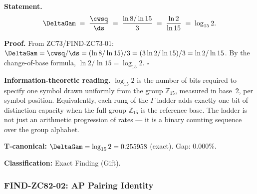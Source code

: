 \documentclass[12pt, a4paper]{article}
\begin{document}
\begin{giftbox}[title={FIND-ZC82-01: $\DeltaGam = \log_{15}2$
  --- The Ladder Step Is One Base-15 Bit ($R_0$, Exact, Gift)}]

\textbf{Statement.}
\begin{equation}
  \DeltaGam \;=\; \frac{\cwsq}{\ds}
  \;=\; \frac{\ln 8/\ln 15}{3}
  \;=\; \frac{\ln 2}{\ln 15}
  \;=\; \log_{15} 2.
  \label{eq:ladder-bit}
\end{equation}

\textbf{Proof.}
From ZC73/FIND-ZC73-01: $\DeltaGam = \cwsq/\ds
= (\ln 8/\ln 15)/3 = (3\ln2/\ln15)/3 = \ln2/\ln15$.
By the change-of-base formula, $\ln2/\ln15 = \log_{15}2$.
\hfill$\square$

\textbf{Information-theoretic reading.}
$\log_{15}2$ is the number of bits required to specify one
symbol drawn uniformly from the group $\mathbb{Z}_{15}$,
measured in base~2, per symbol position. Equivalently, each
rung of the $\Gamma$-ladder adds exactly one bit of distinction
capacity when the full group $\mathbb{Z}_{15}$ is the reference
base. The ladder is not just an arithmetic progression of rates
--- it is a binary counting sequence over the group alphabet.

\textbf{T-canonical:} $\DeltaGam = \log_{15}2 = 0.255958$
(exact). Gap: $0.000\%$.

\textbf{Classification:} Exact Finding (Gift).
\end{giftbox}

\subsubsection{FIND-ZC82-02: AP Pairing Identity}
\label{sec:find02}
\end{document}
